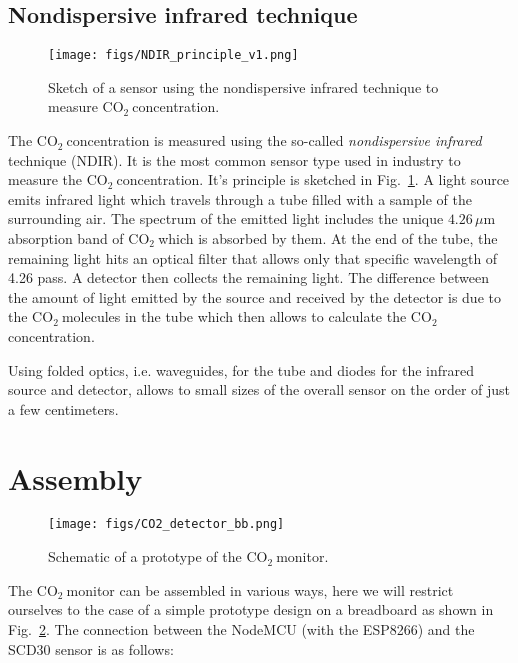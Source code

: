 \documentclass[12pt,a4paper]{article}
\newcommand{\coo}{\ensuremath{\mathrm{CO_2}~}}
\begin{document}
\subsection{Nondispersive infrared technique}
\begin{figure}[ht]
\center
\texttt{[image: figs/NDIR\_principle\_v1.png]}
\caption{Sketch of a sensor using the nondispersive infrared technique to measure \coo concentration.}
\label{f:NDIR_sketch}
\end{figure}
The \coo concentration is measured using the so-called \textit{nondispersive infrared} technique (NDIR). It is the most common sensor type used in industry to measure the \coo concentration. It's principle is sketched in Fig.~\ref{f:NDIR_sketch}. A light source emits infrared light which travels through a tube filled with a sample of the surrounding air. The spectrum of the emitted light includes the unique $4.26\,\mu\mathrm{m}$ absorption band of \coo which is absorbed by them. At the end of the tube, the remaining light hits an optical filter that allows only that specific wavelength of 4.26 pass. A detector then collects the remaining light. The difference between the amount of light emitted by the source and received by the detector is due to the \coo molecules in the tube which then allows to calculate the \coo concentration. 

Using folded optics, i.e. waveguides, for the tube and diodes for the infrared source and detector, allows to small sizes of the overall sensor on the order of just a few centimeters.


\section{Assembly}
\begin{figure}[ht]
\center
\texttt{[image: figs/CO2\_detector\_bb.png]}
\caption{Schematic of a prototype of the \coo monitor.}
\label{f:CO2_fritzing}
\end{figure}
The \coo monitor can be assembled in various ways, here we will restrict ourselves to the case of a simple prototype design on a breadboard as shown in Fig.~\ref{f:CO2_fritzing}. The connection between the NodeMCU (with the ESP8266) and the SCD30 sensor is as follows:\\
\end{document}
